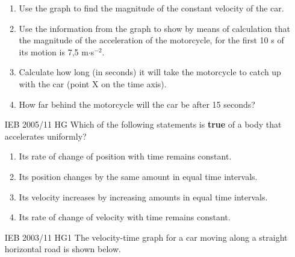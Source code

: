 \begin{enumerate}[noitemsep, label=\textbf{\arabic*}. ]
    \addtocounter{footnote}{-0}
    \label{m38796*id82156}\begin{enumerate}[noitemsep, label=\textbf{\alph*}. ] 
            \label{m38796*uid203}\item Use the graph to find the magnitude of the constant velocity of the car.
\label{m38796*uid204}\item Use the information from the graph to show by means of calculation that the magnitude of the acceleration of the motorcycle, for the first 10 s of its motion is 7,5 m\begin{math}\ensuremath{\cdot}\end{math}s\begin{math}{}^{-2}\end{math}.
\label{m38796*uid205}\item Calculate how long (in seconds) it will take the motorcycle to catch up with the car (point X on the time axis).
\label{m38796*uid206}\item How far behind the motorcycle will the car be after 15 seconds?
\end{enumerate}
                \label{m38796*uid207}\item [IEB 2005/11 HG] Which of the following statements is \textbf{true} of a body that accelerates uniformly?
\label{m38796*id82255}\begin{enumerate}[noitemsep, label=\textbf{\alph*}. ] 
            \label{m38796*uid208}\item Its rate of change of position with time remains constant.
\label{m38796*uid209}\item Its position changes by the same amount in equal time intervals.
\label{m38796*uid210}\item Its velocity increases by increasing amounts in equal time intervals.
\label{m38796*uid211}\item Its rate of change of velocity with time remains constant.
\end{enumerate}
                \label{m38796*uid212}\item [IEB 2003/11 HG1] The velocity-time graph for a car moving along a straight horizontal road is shown below.

    \setcounter{subfigure}{0}



\end{enumerate}

